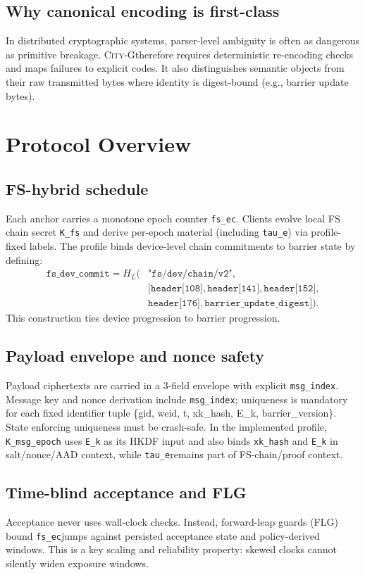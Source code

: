 \documentclass[11pt]{article}
\newcommand{\cityg}{\textsc{City-G}}
\newcommand{\tauE}{\texttt{tau\_e}}
\newcommand{\fsEc}{\texttt{fs\_ec}}
\begin{document}
\subsection{Why canonical encoding is first-class}
In distributed cryptographic systems, parser-level ambiguity is often as dangerous as primitive breakage. \cityg therefore requires deterministic re-encoding checks and maps failures to explicit codes. It also distinguishes semantic objects from their raw transmitted bytes where identity is digest-bound (e.g., barrier update bytes).

\section{Protocol Overview}
\subsection{FS-hybrid schedule}
Each anchor carries a monotone epoch counter \fsEc. Clients evolve local FS chain secret \texttt{K\_fs} and derive per-epoch material (including \tauE) via profile-fixed labels. The profile binds device-level chain commitments to barrier state by defining:
\begin{equation}
\begin{split}
\texttt{fs\_dev\_commit} = H_L(&\texttt{"fs/dev/chain/v2"},\\
&[\texttt{header[108]}, \texttt{header[141]}, \texttt{header[152]},\\
&\texttt{header[176]}, \texttt{barrier\_update\_digest}]).
\end{split}
\end{equation}
This construction ties device progression to barrier progression.

\subsection{Payload envelope and nonce safety}
Payload ciphertexts are carried in a 3-field envelope with explicit \texttt{msg\_index}. Message key and nonce derivation include \texttt{msg\_index}; uniqueness is mandatory for each fixed identifier tuple \{gid, weid, t, xk\_hash, E\_k, barrier\_version\}. State enforcing uniqueness must be crash-safe.
In the implemented profile, \texttt{K\_msg\_epoch} uses \texttt{E\_k} as its HKDF input and also binds \texttt{xk\_hash} and \texttt{E\_k} in salt/nonce/AAD context, while \tauE remains part of FS-chain/proof context.

\subsection{Time-blind acceptance and FLG}
Acceptance never uses wall-clock checks. Instead, forward-leap guards (FLG) bound \fsEc jumps against persisted acceptance state and policy-derived windows. This is a key scaling and reliability property: skewed clocks cannot silently widen exposure windows.
\end{document}
